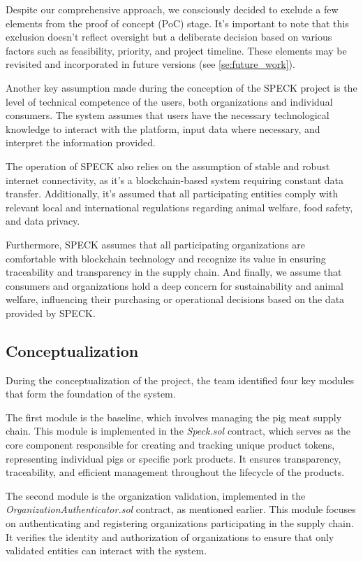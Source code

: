 \documentclass[oneside,a4paper,12pt, colorinlistoftodos]{article} %
\begin{document}
Despite our comprehensive approach, we consciously decided to exclude a few elements from the proof of concept (PoC) stage. It's important to note that this exclusion doesn't reflect oversight but a deliberate decision based on various factors such as feasibility, priority, and project timeline. These elements may be revisited and incorporated in future versions (see \ref{se:future_work}).

Another key assumption made during the conception of the SPECK project is the level of technical competence of the users, both organizations and individual consumers. The system assumes that users have the necessary technological knowledge to interact with the platform, input data where necessary, and interpret the information provided.

The operation of SPECK also relies on the assumption of stable and robust internet connectivity, as it's a blockchain-based system requiring constant data transfer. Additionally, it's assumed that all participating entities comply with relevant local and international regulations regarding animal welfare, food safety, and data privacy.

Furthermore, SPECK assumes that all participating organizations are comfortable with blockchain technology and recognize its value in ensuring traceability and transparency in the supply chain. And finally, we assume that consumers and organizations hold a deep concern for sustainability and animal welfare, influencing their purchasing or operational decisions based on the data provided by SPECK.

\subsection{Conceptualization}\label{se:conceptualization} 

During the conceptualization of the project, the team identified four key modules that form the foundation of the system.

The first module is the baseline, which involves managing the pig meat supply chain. This module is implemented in the \textit{Speck.sol} contract, which serves as the core component responsible for creating and tracking unique product tokens, representing individual pigs or specific pork products. It ensures transparency, traceability, and efficient management throughout the lifecycle of the products.

The second module is the organization validation, implemented in the \textit{OrganizationAuthenticator.sol} contract, as mentioned earlier. This module focuses on authenticating and registering organizations participating in the supply chain. It verifies the identity and authorization of organizations to ensure that only validated entities can interact with the system.
\end{document}
